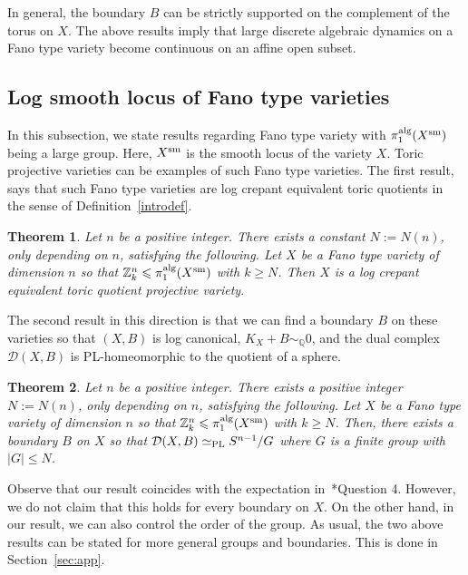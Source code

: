 \documentclass{amsart}
\renewcommand{\qq}{\mathbb{Q}}
\newcommand{\zz}{\mathbb{Z}}
\newtheorem{introthm}{Theorem}
\theoremstyle{remark}
\numberwithin{equation}{section}
\begin{document}
In general, the boundary $B$ can be strictly supported on the complement of the torus on $X$.
The above results imply that large discrete algebraic dynamics on a Fano type variety become continuous on an affine open subset.

\subsection{Log smooth locus of Fano type varieties}
In this subsection, we state results regarding Fano type variety
with $\pi_1^{\rm alg}(X^{\rm sm})$ being a large group.
Here, $X^{\rm sm}$ is the smooth locus of the variety $X$.
Toric projective varieties can be examples of such Fano type varieties.
The first result, says that such Fano type varieties are log crepant equivalent  toric quotients in the sense of Definition~\ref{introdef}.

\begin{introthm}\label{introthm:log-smooth-locus}
Let $n$ be a positive integer.
There exists a constant $N:=N(n)$, only depending on $n$,
satisfying the following.
Let $X$ be a Fano type variety of dimension $n$
so that $\zz_k^n \leqslant \pi_1^{\rm alg}(X^{\rm sm})$
with $k\geq N$.
Then $X$ is a log crepant equivalent  toric quotient projective variety.
\end{introthm}

The second result in this direction is that we can find a
boundary $B$ on these varieties so that $(X,B)$ is log canonical,
$K_X+B\sim_\qq 0$, and the dual complex $\mathcal{D}(X,B)$
is PL-homeomorphic to the quotient of a sphere.

\begin{introthm}\label{introthm:dual-complex}
Let $n$ be a positive integer.
There exists a positive integer $N:=N(n)$, only depending on $n$,
satisfying the following.
Let $X$ be a Fano type variety of dimension $n$ so that
$\zz^n_k \leqslant \pi_1^{\rm alg}(X^{\rm sm})$ with $k\geq N$.
Then, there exists a boundary $B$ on $X$ so that
$\mathcal{D}(X,B)\simeq_{\rm PL} S^{n-1}/G$
where $G$ is a finite group
with $|G|\leq N$.
\end{introthm}

Observe that our result coincides with the expectation  in~\cite{KX16}*{Question 4}.
However, we do not claim that this holds for every boundary on $X$.
On the other hand, in our result, we can also control the order of the group.
As usual, the two above results can be stated for more general groups and boundaries. This is done in Section~\ref{sec:app}.
\end{document}
